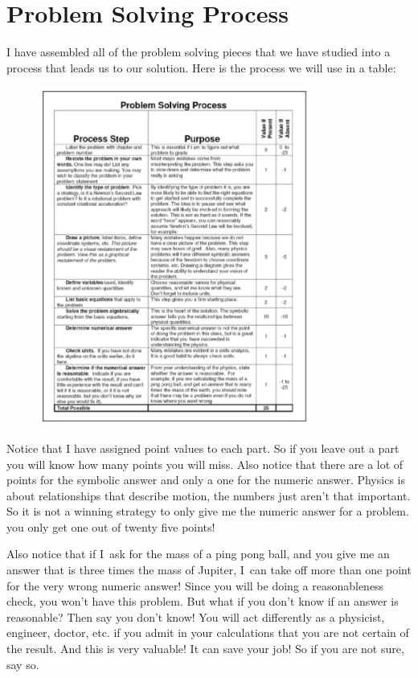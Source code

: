 \documentclass[]{Book}
\begin{document}
\section{Problem Solving Process}

I have assembled all of the problem solving pieces that we have studied into
a process that leads us to our solution. Here is the process we will use in
a table:

\begin{figure}[h!]
	\begin{center}
		\includegraphics[width=0.8\textwidth]{Problem_Solving_Process}	
		\label{fig:PSP2}
	\end{center}
\end{figure}

Notice that I have assigned point values to each part. So if you leave out a
part you will know how many points you will miss. Also notice that there are
a lot of points for the symbolic answer and only a one for the numeric
answer. Physics is about relationships that describe motion, the numbers
just aren't that important. So it is not a winning strategy to only give me
the numeric answer for a problem. you only get one out of twenty five points!

Also notice that if I\ ask for the mass of a ping pong ball, and you give me
an answer that is three times the mass of Jupiter, I\ can take off more than
one point for the very wrong numeric answer! Since you will be doing a
reasonableness check, you won't have this problem. But what if you don't
know if an answer is reasonable? Then say you don't know! You will act
differently as a physicist, engineer, doctor, etc. if you admit in your
calculations that you are not certain of the result. And this is very
valuable! It can save your job! So if you are not sure, say so.
\end{document}
